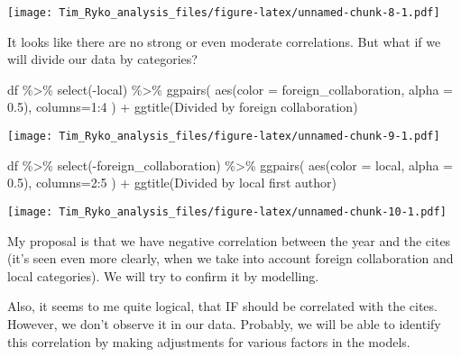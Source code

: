 \documentclass[
]{article}
\newenvironment{Shaded}{\begin{snugshade}}{\end{snugshade}}
\newcommand{\AttributeTok}[1]{\textcolor[rgb]{0.77,0.63,0.00}{#1}}
\newcommand{\DecValTok}[1]{\textcolor[rgb]{0.00,0.00,0.81}{#1}}
\newcommand{\FloatTok}[1]{\textcolor[rgb]{0.00,0.00,0.81}{#1}}
\newcommand{\FunctionTok}[1]{\textcolor[rgb]{0.00,0.00,0.00}{#1}}
\newcommand{\NormalTok}[1]{#1}
\newcommand{\SpecialCharTok}[1]{\textcolor[rgb]{0.00,0.00,0.00}{#1}}
\newcommand{\StringTok}[1]{\textcolor[rgb]{0.31,0.60,0.02}{#1}}
\begin{document}
\texttt{[image: Tim\_Ryko\_analysis\_files/figure-latex/unnamed-chunk-8-1.pdf]}

It looks like there are no strong or even moderate correlations. But
what if we will divide our data by categories?

\begin{Shaded}
\begin{Highlighting}[]
\NormalTok{df }\SpecialCharTok{\%\textgreater{}\%}
  \FunctionTok{select}\NormalTok{(}\SpecialCharTok{{-}}\NormalTok{local) }\SpecialCharTok{\%\textgreater{}\%}
    \FunctionTok{ggpairs}\NormalTok{(}
      \FunctionTok{aes}\NormalTok{(}\AttributeTok{color =}\NormalTok{ foreign\_collaboration, }\AttributeTok{alpha =} \FloatTok{0.5}\NormalTok{),}
      \AttributeTok{columns=}\DecValTok{1}\SpecialCharTok{:}\DecValTok{4}
\NormalTok{    ) }\SpecialCharTok{+}
  \FunctionTok{ggtitle}\NormalTok{(}\StringTok{\textquotesingle{}Divided by foreign collaboration\textquotesingle{}}\NormalTok{)}
\end{Highlighting}
\end{Shaded}

\texttt{[image: Tim\_Ryko\_analysis\_files/figure-latex/unnamed-chunk-9-1.pdf]}

\begin{Shaded}
\begin{Highlighting}[]
\NormalTok{df }\SpecialCharTok{\%\textgreater{}\%}
  \FunctionTok{select}\NormalTok{(}\SpecialCharTok{{-}}\NormalTok{foreign\_collaboration) }\SpecialCharTok{\%\textgreater{}\%}
    \FunctionTok{ggpairs}\NormalTok{(}
      \FunctionTok{aes}\NormalTok{(}\AttributeTok{color =}\NormalTok{ local, }\AttributeTok{alpha =} \FloatTok{0.5}\NormalTok{),}
      \AttributeTok{columns=}\DecValTok{2}\SpecialCharTok{:}\DecValTok{5}
\NormalTok{    ) }\SpecialCharTok{+}
  \FunctionTok{ggtitle}\NormalTok{(}\StringTok{\textquotesingle{}Divided by local first author\textquotesingle{}}\NormalTok{)}
\end{Highlighting}
\end{Shaded}

\texttt{[image: Tim\_Ryko\_analysis\_files/figure-latex/unnamed-chunk-10-1.pdf]}

My proposal is that we have negative correlation between the year and
the cites (it's seen even more clearly, when we take into account
foreign collaboration and local categories). We will try to confirm it
by modelling.

Also, it seems to me quite logical, that IF should be correlated with
the cites. However, we don't observe it in our data. Probably, we will
be able to identify this correlation by making adjustments for various
factors in the models.
\end{document}
